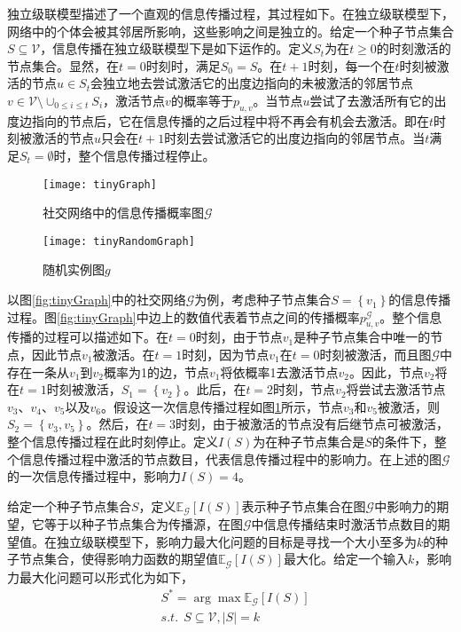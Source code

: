独立级联模型描述了一个直观的信息传播过程，其过程如下。在独立级联模型下，网络中的个体会被其邻居所影响，这些影响之间是独立的。给定一个种子节点集合$S \subseteq \mathcal{V}$，信息传播在独立级联模型下是如下运作的。定义$S_t$为在$t \geq 0$的时刻激活的节点集合。显然，在$t=0$时刻时，满足$S_0=S$。在$t+1$时刻，每一个在$t$时刻被激活的节点$u \in S_t$会独立地去尝试激活它的出度边指向的未被激活的邻居节点$v \in \mathcal{V} \setminus \cup_{0 \leq i \leq t}S_i$，激活节点$v$的概率等于$p_{u,v}$。当节点$u$尝试了去激活所有它的出度边指向的节点后，它在信息传播的之后过程中将不再会有机会去激活。即在$t$时刻被激活的节点$u$只会在$t+1$时刻去尝试激活它的出度边指向的邻居节点。当$t$满足$S_t = \emptyset$时，整个信息传播过程停止。

\begin{figure}[ht]
   \begin{minipage}{0.48\textwidth}
     \centering
     \texttt{[image: tinyGraph]}
     \caption{社交网络中的信息传播概率图$\mathcal{G}$}
     \label{fig:tinyGraph}
   \end{minipage}
   \hfill
   \begin {minipage}{0.48\textwidth}
     \centering
     \texttt{[image: tinyRandomGraph]}
     \caption{随机实例图$g$}
     \label{fig:tinyRandomGraph}
   \end{minipage}
\end{figure}

以图\ref{fig:tinyGraph}中的社交网络$\mathcal{G}$为例，考虑种子节点集合$S=\left\{v_1\right\}$的信息传播过程。图\ref{fig:tinyGraph}中边上的数值代表着节点之间的传播概率$p^\mathcal{G}_{u,v}$。整个信息传播的过程可以描述如下。在$t=0$时刻，由于节点$v_1$是种子节点集合中唯一的节点，因此节点$v_1$被激活。在$t=1$时刻，因为节点$v_1$在$t=0$时刻被激活，而且图$\mathcal{G}$中存在一条从$v_1$到$v_2$概率为1的边，节点$v_1$将依概率1去激活节点$v_2$。因此，节点$v_2$将在$t=1$时刻被激活，$S_1=\left\{v_2\right\}$。此后，在$t=2$时刻，节点$v_2$将尝试去激活节点$v_3$、$v_4$、$v_5$以及$v_6$。假设这一次信息传播过程如图\ref{fig:tinyRandomGraph}所示，节点$v_3$和$v_5$被激活，则$S_2=\left\{v_3, v_5\right\}$。然后，在$t=3$时刻，由于被激活的节点没有后继节点可被激活，整个信息传播过程在此时刻停止。定义$I\left(S\right)$为在种子节点集合是$S$的条件下，整个信息传播过程中激活的节点数目，代表信息传播过程中的影响力。在上述的图$\mathcal{G}$的一次信息传播过程中，影响力$I\left(S\right)=4$。

给定一个种子节点集合$S$，定义$\mathbb{E}_\mathcal{G}\left[I\left(S\right)\right]$表示种子节点集合在图$\mathcal{G}$中影响力的期望，它等于以种子节点集合为传播源，在图$\mathcal{G}$中信息传播结束时激活节点数目的期望值。在独立级联模型下，影响力最大化问题的目标是寻找一个大小至多为$k$的种子节点集合，使得影响力函数的期望值$\mathbb{E}_\mathcal{G}\left[I\left(S\right)\right]$最大化。给定一个输入$k$，影响力最大化问题可以形式化为如下，
\begin{equation}
\label{eq:imProblem}
    \begin{split}
        &S^{\ast} = \arg\max{\mathbb{E}_\mathcal{G}\left[I\left(S\right)\right]}\\
        &s.t.~~S \subseteq \mathcal{V},\left\vert{S}\right\vert = k
    \end{split}
\end{equation}

